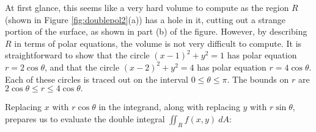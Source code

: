 {At first glance, this seems like a very hard volume to compute as the region $R$ (shown in Figure \ref{fig:doublepol2}(a)) has a hole in it, cutting out a strange portion of the surface, as shown in part (b) of the figure. However, by describing $R$ in terms of polar equations, the volume is not very difficult to compute.
It is straightforward to show that the circle $(x-1)^2+y^2=1$ has polar equation $r=2\cos\theta$, and that the circle $(x-2)^2+y^2=4$ has polar equation $r=4\cos\theta$. Each of these circles is traced out on the interval $0\leq\theta\leq\pi$. The bounds on $r$ are $2\cos\theta\leq r\leq 4\cos\theta.$ 

Replacing $x$ with $r\cos\theta$ in the integrand, along with replacing $y$ with $r\sin \theta$, prepares us to evaluate the double integral $\iint_Rf(x,y)\ dA$:


}
